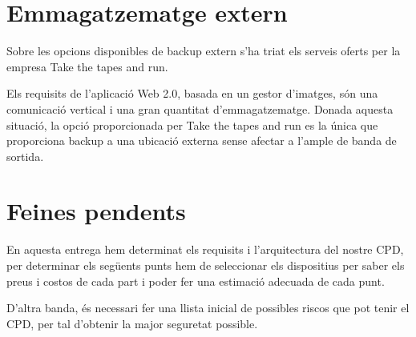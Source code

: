\documentclass[a4paper, 11pt]{article}
\begin{document}
\section{Emmagatzematge extern}
Sobre les opcions disponibles de backup extern s’ha triat els serveis oferts per la empresa Take the tapes and run.

Els requisits de l’aplicació Web 2.0, basada en un gestor d’imatges, són una comunicació vertical i una gran quantitat d’emmagatzematge. Donada aquesta situació, la opció proporcionada per Take the tapes and run es la única que proporciona backup a una ubicació externa sense afectar a l'ample de banda de sortida.

\section{Feines pendents}
En aquesta entrega hem determinat els requisits i l’arquitectura del nostre CPD, per determinar els següents punts hem de seleccionar els dispositius per saber els preus i costos de cada part i poder fer una estimació adecuada de cada punt.

D’altra banda, és necessari fer una llista inicial de possibles riscos que pot tenir el CPD, per tal d’obtenir la major seguretat possible. 
\end{document}
